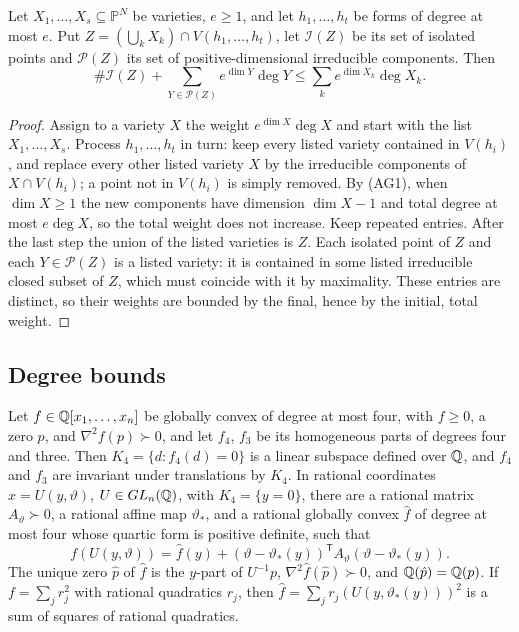 \begin{lemma}
\label{lem:algebraic-weighted-count}
Let $X_1,\ldots,X_s\subseteq\mathbb P^N$ be varieties, $e\ge1$, and let
$h_1,\ldots,h_t$ be forms of degree at most $e$. Put
$Z=(\bigcup_kX_k)\cap V(h_1,\ldots,h_t)$, let $\mathcal I(Z)$ be its set of
isolated points and $\mathcal P(Z)$ its set of positive-dimensional
irreducible components. Then
\[
 \#\mathcal I(Z)+\sum_{Y\in\mathcal P(Z)}e^{\dim Y}\deg Y
 \le\sum_ke^{\dim X_k}\deg X_k .
\]
\end{lemma}

\begin{proof}
Assign to a variety $X$ the weight $e^{\dim X}\deg X$ and start with the list
$X_1,\ldots,X_s$. Process $h_1,\ldots,h_t$ in turn: keep every listed variety
contained in $V(h_i)$, and replace every other listed variety $X$ by the
irreducible components of $X\cap V(h_i)$; a point not in $V(h_i)$ is simply
removed. By (AG1), when $\dim X\ge1$ the new components have dimension
$\dim X-1$ and total degree at most $e\deg X$, so the total weight does not
increase. Keep repeated entries. After the last step the union of the listed
varieties is $Z$. Each isolated point of $Z$ and each $Y\in\mathcal P(Z)$ is a
listed variety: it is contained in some listed irreducible closed subset of
$Z$, which must coincide with it by maximality. These entries are distinct, so
their weights are bounded by the final, hence by the initial, total weight.
\end{proof}

\subsection{Degree bounds}
\label{app:algebraic-bounds}

\begin{lemma}
\label{lem:algebraic-flat}
Let $f\in\mathbb Q[x_1,\ldots,x_n]$ be globally convex of degree at most four, with
$f\ge0$, a zero $p$, and $\nabla^2f(p)\succ0$, and let $f_4$, $f_3$ be its
homogeneous parts of degrees four and three. Then
$K_4=\{d:f_4(d)=0\}$ is a linear subspace defined over $\mathbb Q$, and $f_4$ and
$f_3$ are invariant under translations by $K_4$. In rational coordinates
$x=U(y,\vartheta)$, $U\in GL_n(\mathbb Q)$, with $K_4=\{y=0\}$, there are a rational
matrix $A_\vartheta\succ0$, a rational affine map $\vartheta_*$, and a
rational globally convex $\hat f$ of degree at most four whose quartic form is
positive definite, such that
\[
 f(U(y,\vartheta))=\hat f(y)+(\vartheta-\vartheta_*(y))^{\mathsf T}A_\vartheta
 (\vartheta-\vartheta_*(y)).
\]
The unique zero $\hat p$ of $\hat f$ is the $y$-part of $U^{-1}p$,
$\nabla^2\hat f(\hat p)\succ0$, and $\mathbb Q(\hat p)=\mathbb Q(p)$. If $f=\sum_jr_j^2$ with
rational quadratics $r_j$, then $\hat f=\sum_jr_j(U(y,\vartheta_*(y)))^2$ is a
sum of squares of rational quadratics.
\end{lemma}

